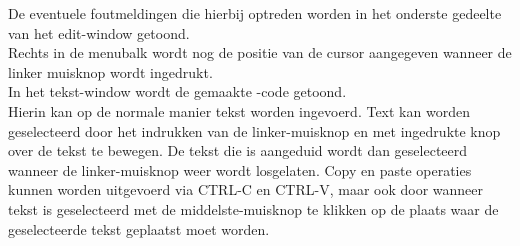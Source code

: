 De eventuele foutmeldingen die hierbij optreden worden in het onderste
gedeelte van het edit-window getoond.\\
Rechts in de menubalk wordt nog de positie van de cursor aangegeven wanneer
de linker muisknop wordt ingedrukt.\\
In het tekst-window wordt de gemaakte -code getoond.\\
Hierin kan op de normale manier tekst worden ingevoerd.
Text kan worden geselecteerd door het indrukken van de linker-muisknop en met
ingedrukte knop over de tekst te bewegen. De tekst die is aangeduid wordt dan
geselecteerd wanneer de linker-muisknop weer wordt losgelaten.
Copy en paste operaties kunnen worden uitgevoerd via CTRL-C en CTRL-V, maar ook
door wanneer tekst is geselecteerd met de middelste-muisknop te klikken op de
plaats waar de geselecteerde tekst geplaatst moet worden.
\clearpage
